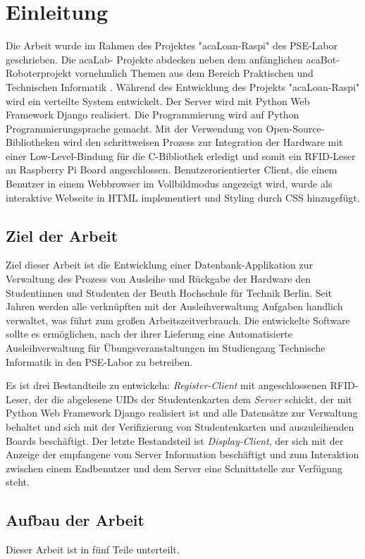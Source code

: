 \chapter{Einleitung}
\label{sec:intro}
Die Arbeit wurde im Rahmen des Projektes "acaLoan-Raspi" \cite{website:17} des PSE-Labor geschrieben. Die acaLab- Projekte abdecken neben dem anfänglichen acaBot-Roboterprojekt vornehmlich Themen aus dem Bereich Praktischen und Technischen Informatik  \cite{website:1}. Während des Entwicklung des Projekts  "acaLoan-Raspi" wird ein verteilte System entwickelt. Der Server wird mit Python Web Framework Django realisiert. Die Programmierung wird auf Python Programmierungsprache gemacht. Mit der Verwendung von Open-Source-Bibliotheken wird den schrittweisen Prozess zur Integration der Hardware mit einer Low-Level-Bindung für die C-Bibliothek erledigt und somit ein RFID-Leser an Raspberry Pi Board angeschlossen. Benutzerorientierter Client, die einem Benutzer in einem Webbrowser im Vollbildmodus angezeigt wird, wurde als interaktive Webseite in HTML implementiert und Styling durch CSS hinzugefügt.


\section{Ziel der Arbeit}
\label{sec:intro:goal}
Ziel dieser Arbeit ist die Entwicklung einer Datenbank-Applikation zur Verwaltung des Prozess von Ausleihe und Rückgabe der Hardware den Studentinnen und Studenten der Beuth Hochschule für Technik Berlin. Seit Jahren werden alle verknüpften mit der Ausleihverwaltung Aufgaben handlich verwaltet, was führt zum großen Arbeitszeitverbrauch. Die entwickelte Software sollte es ermöglichen, nach der ihrer Lieferung eine Automatisierte Ausleihverwaltung für Übungsveranstaltungen im Studiengang Technische Informatik in den PSE-Labor zu betreiben. 

Es ist drei Bestandteile zu entwickeln: \textit{Register-Client} mit angeschlossenen RFID-Leser, der die abgelesene UIDs der Studentenkarten dem \textit{Server} schickt, der mit Python Web Framework Django realisiert ist und alle Datensätze zur Verwaltung behaltet und sich mit der Verifizierung von Studentenkarten und auszuleihenden Boards beschäftigt. Der letzte Bestandsteil ist \textit{Display-Client}, der sich mit der Anzeige der empfangene vom Server Information beschäftigt und zum Interaktion zwischen einem Endbenutzer und dem Server eine Schnittstelle zur Verfügung steht. 


\section{Aufbau der Arbeit}
\label{sec:intro:themengebiet}
Dieser Arbeit ist in fünf Teile unterteilt. 

